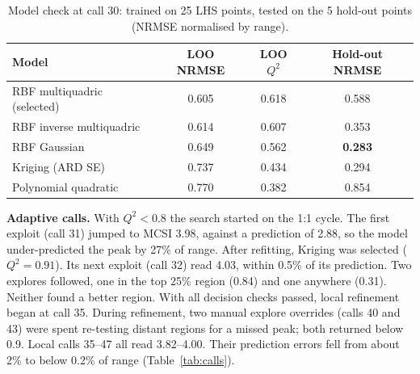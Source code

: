\documentclass[11pt,a4paper]{article}
\newcommand{\Qsq}{Q^2}
\begin{document}
\begin{table}[h]
\centering\small
\caption{Model check at call 30: trained on 25 LHS points, tested on the 5 hold-out points (NRMSE normalised by range).}
\label{tab:holdout}
\begin{tabular}{lccc}
\toprule
Model & LOO NRMSE & LOO $\Qsq$ & Hold-out NRMSE \\
\midrule
RBF multiquadric (selected) & 0.605 & 0.618 & 0.588 \\
RBF inverse multiquadric & 0.614 & 0.607 & 0.353 \\
RBF Gaussian & 0.649 & 0.562 & \textbf{0.283} \\
Kriging (ARD SE) & 0.737 & 0.434 & 0.294 \\
Polynomial quadratic & 0.770 & 0.382 & 0.854 \\
\bottomrule
\end{tabular}
\end{table}

\textbf{Adaptive calls.}
With $\Qsq<0.8$ the search started on the 1:1 cycle.
The first exploit (call 31) jumped to MCSI 3.98, against a prediction of 2.88, so the model under-predicted the peak by 27\% of range.
After refitting, Kriging was selected ($\Qsq=0.91$).
Its next exploit (call 32) read 4.03, within 0.5\% of its prediction.
Two explores followed, one in the top 25\% region (0.84) and one anywhere (0.31).
Neither found a better region.
With all decision checks passed, local refinement began at call 35.
During refinement, two manual explore overrides (calls 40 and 43) were spent re-testing distant regions for a missed peak; both returned below 0.9.
Local calls 35--47 all read 3.82--4.00.
Their prediction errors fell from about 2\% to below 0.2\% of range (Table~\ref{tab:calls}).
\end{document}
